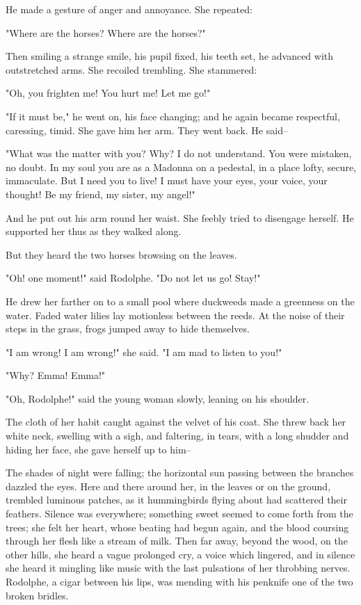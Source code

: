 \documentclass{tufte-book}
\begin{document}
He made a gesture of anger and annoyance. She repeated:

"Where are the horses? Where are the horses?"

Then smiling a strange smile, his pupil fixed, his teeth set, he
advanced with outstretched arms. She recoiled trembling. She stammered:

"Oh, you frighten me! You hurt me! Let me go!"

"If it must be," he went on, his face changing; and he again became
respectful, caressing, timid. She gave him her arm. They went back. He
said--

"What was the matter with you? Why? I do not understand. You were
mistaken, no doubt. In my soul you are as a Madonna on a pedestal, in
a place lofty, secure, immaculate. But I need you to live! I must have
your eyes, your voice, your thought! Be my friend, my sister, my angel!"

And he put out his arm round her waist. She feebly tried to disengage
herself. He supported her thus as they walked along.

But they heard the two horses browsing on the leaves.

"Oh! one moment!" said Rodolphe. "Do not let us go! Stay!"

He drew her farther on to a small pool where duckweeds made a greenness
on the water. Faded water lilies lay motionless between the reeds.
At the noise of their steps in the grass, frogs jumped away to hide
themselves.

"I am wrong! I am wrong!" she said. "I am mad to listen to you!"

"Why? Emma! Emma!"

"Oh, Rodolphe!" said the young woman slowly, leaning on his shoulder.

The cloth of her habit caught against the velvet of his coat. She threw
back her white neck, swelling with a sigh, and faltering, in tears, with
a long shudder and hiding her face, she gave herself up to him--

The shades of night were falling; the horizontal sun passing between the
branches dazzled the eyes. Here and there around her, in the leaves
or on the ground, trembled luminous patches, as it hummingbirds flying
about had scattered their feathers. Silence was everywhere; something
sweet seemed to come forth from the trees; she felt her heart, whose
beating had begun again, and the blood coursing through her flesh like a
stream of milk. Then far away, beyond the wood, on the other hills, she
heard a vague prolonged cry, a voice which lingered, and in silence she
heard it mingling like music with the last pulsations of her throbbing
nerves. Rodolphe, a cigar between his lips, was mending with his
penknife one of the two broken bridles.
\end{document}
